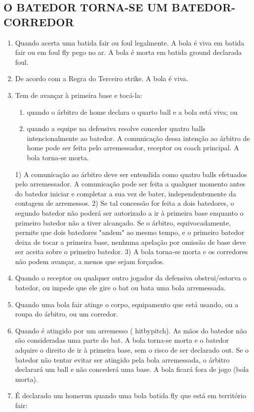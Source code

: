 \subsection{O BATEDOR TORNA-SE UM BATEDOR-CORREDOR}
\begin{enumerate}[label=(\alph*)]
	\item   Quando acerta uma batida \gls{fair} ou \gls{foul} legalmente. A bola é viva em batida \gls{fair} ou em \gls{foul fly} pego no ar. A bola é morta em batida \gls{ground} declarada \gls{foul}.
	\item  De acordo com a Regra do Terceiro \gls{strike}. A bola é viva.
	\item  Tem de avançar à primeira base e tocá-la:

	 \begin{enumerate}[label=\roman*.]
	 	\item quando o árbitro de \gls{home} declara o quarto \gls{ball} e a bola está viva; ou
		\item quando a equipe na defensiva resolve conceder quatro \glspl{ball} intencionalmente ao batedor. A comunicação dessa intenção ao árbitro de
	 \gls{home} pode ser feita pelo arremessador, receptor ou \gls{coach} principal. A bola torna-se morta.
	\end{enumerate}

	 1) A comunicação ao árbitro deve ser entendida como quatro \glspl{ball} efetuados pelo arremessador. A comunicação pode ser feita a qualquer
	 momento antes do batedor iniciar e completar a sua vez de bater, independentemente da contagem de arremessos.
	 2) Se tal concessão for feita a dois batedores, o segundo batedor não poderá ser autorizado a ir à primeira base enquanto o primeiro batedor
	 não a tiver alcançado. Se o árbitro, equivocadamente, permite que dois batedores "andem" ao mesmo tempo, e o primeiro batedor deixa de tocar
	 a primeira base, nenhuma apelação por omissão de base deve ser aceita sobre o primeiro batedor.
	 3) A bola torna-se morta e os corredores não podem avançar, a menos  que sejam forçados.

	\item  Quando o receptor ou qualquer outro jogador da defensiva obstrui/estorva o batedor, ou impede que ele gire o \gls{bat} ou bata uma bola arremessada.
	\item  Quando uma bola \gls{fair} atinge o corpo, equipamento que está usando, ou a roupa do árbitro, ou um corredor.
	\item  Quando é atingido por um arremesso ( \gls{hitbypitch}). As mãos do batedor não são consideradas uma parte do \gls{bat}. A bola torna-se morta e o batedor adquire o direito de ir à primeira base, sem o risco de ser declarado \gls{out}. Se o batedor não tentar evitar ser atingido pela bola arremessada, o árbitro declarará um \gls{ball} e não concederá uma base. A bola ficará fora de jogo (bola morta).
	\item   É declarado um \gls{homerun} quando uma bola batida \gls{fly} que está em território \gls{fair}:


\end{enumerate}
